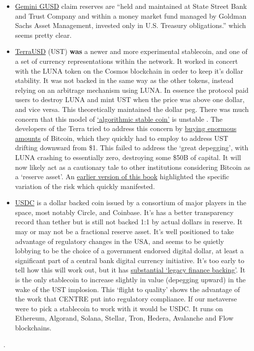 \begin{itemize}
\item \href{https://www.gemini.com/static/dollar/gemini-dollar-whitepaper.pdf}{Gemini GUSD} claim reserves are ``held and maintained at State Street Bank and Trust Company and within a money market fund managed by Goldman Sachs Asset Management, invested only in U.S. Treasury obligations.'' which seems pretty clear.
\item \href{https://assets.website-files.com/611153e7af981472d8da199c/618b02d13e938ae1f8ad1e45_Terra_White_paper.pdf}{TerraUSD} (UST) \textbf{was} a newer and more experimental stablecoin, and one of a set of currency representations within the network. It worked in concert with the LUNA token on the Cosmos blockchain in order to keep it's dollar stability. It was not backed in the same way as the other tokens, instead relying on an arbitrage mechanism using LUNA. In essence the protocol paid users to destroy LUNA and mint UST when the price was above one dollar, and vice versa. This theoretically maintained the dollar peg. There was much concern that this model of \href{https://mirror.xyz/damsondao.eth/OVeBrmrfcWm7uKLlA2Q4W1XTVkFU3cMKfNWhgf7mQuM}{`algorithmic stable coin'} is unstable \cite{clements2021built}. The developers of the Terra tried to address this concern by \href{https://etherscan.io/address/0xad41bd1cf3fd753017ef5c0da8df31a3074ea1ea}{buying enormous amounts} of Bitcoin, which they quickly had to employ to address UST drifting downward from \$1. This failed to address the `great depegging', with LUNA crashing to essentially zero, destroying some \$50B of capital. It will now likely act as a cautionary tale to other institutions considering Bitcoin as a `reserve asset'. An \href{https://github.com/GMCyberFoundry/Metaverse/blob/b06547bf290392d2ff02e5142dae7386d888a9de/Book/04_money.tex#L186}{earlier version of this book} highlighted the specific variation of the risk which quickly manifested.
\item \href{https://f.hubspotusercontent30.net/hubfs/9304636/PDF/centre-whitepaper.pdf}{USDC} is a dollar backed coin issued by a consortium of major players in the space, most notably Circle, and Coinbase. It's has a better transparency record than tether but is still not backed 1:1 by actual dollars in reserve. It may or may not be a fractional reserve asset. It's  well positioned to take advantage of regulatory changes in the USA, and seems to be quietly lobbying to be the choice of a government endorsed digital dollar, at least a significant part of a central bank digital currency initiative. It's too early to tell how this will work out, but it has \href{https://www.forbes.com/sites/ninabambysheva/2022/04/13/blackrocks-newest-investment-paves-the-way-for-digital-assets-on-wall-street/?}{substantial `legacy finance backing'}. It is the only stablecoin to increase slightly in value (depegging upward) in the wake of the UST implosion. This `flight to quality' shows the advantage of the work that CENTRE put into regulatory compliance. If our metaverse were to pick a stablecoin to work with it would be USDC. It runs on Ethereum, Algorand, Solana, Stellar, Tron, Hedera, Avalanche and Flow blockchains. 
\end{itemize}  .

